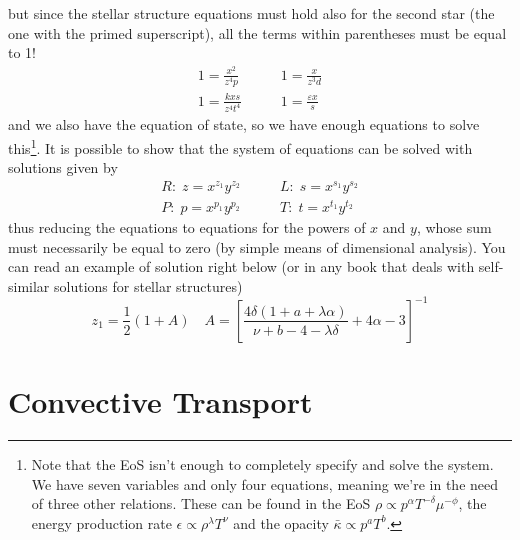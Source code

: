 but since the stellar structure equations must hold also for the second star (the one with the primed superscript), all the terms within parentheses must be equal to 1!
\begin{align}
	1 = \frac{x^{2}}{z^{4}p} \quad & \quad 1 = \frac{x}{z^{3}d}\\
	1 = \frac{kxs}{z^{4}t^{4}} \quad & \quad 1 = \frac{\varepsilon x}{s}
\end{align}
and we also have the equation of state, so we have enough equations to solve this\footnote{Note that the EoS isn't enough to completely specify and solve the system. We have seven variables and only four equations, meaning we're in the need of three other relations. These can be found in the EoS $\rho \propto p^{\alpha}T^{-\delta}\mu^{-\phi}$, the energy production rate $\epsilon \propto \rho^{\lambda}T^{\nu}$ and the opacity $\bar{\kappa}\propto p^{a}T^{b}$.}. It is possible to show that the system of equations can be solved with solutions given by
\begin{align*}
	R:\;z = x^{z_{1}}y^{z_{2}} \quad & \quad L:\;s = x^{s_{1}}y^{s_{2}}\\
	P:\;p = x^{p_{1}}y^{p_{2}} \quad & \quad T:\;t = x^{t_{1}}y^{t_{2}}
\end{align*}
thus reducing the equations to equations for the powers of $x$ and $y$, whose sum must necessarily be equal to zero (by simple means of dimensional analysis). You can read an example of solution right below (or in any book that deals with self-similar solutions for stellar structures)
\begin{equation*}
	z_{1} = \frac{1}{2}(1+A) \quad A = \left[\frac{4\delta(1+a+\lambda\alpha)}{\nu+b-4-\lambda\delta}+4\alpha-3\right]^{-1}
\end{equation*}

\section{Convective Transport}

